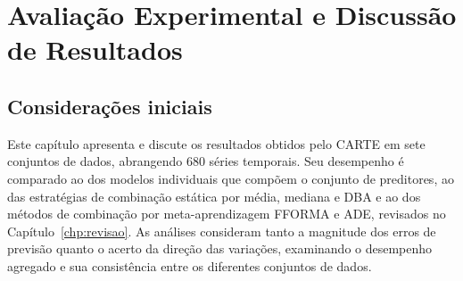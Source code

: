 \chapter{Avaliação Experimental e Discussão de Resultados}\label{chp:resultados}

\section{Considerações iniciais} \label{sec:resultados-iniciais}



Este capítulo apresenta e discute os resultados obtidos pelo CARTE em sete conjuntos de dados, abrangendo 680 séries temporais. Seu desempenho é comparado ao dos modelos individuais que compõem o conjunto de preditores, ao das estratégias de combinação estática por média, mediana e DBA e ao dos métodos de combinação por meta-aprendizagem FFORMA e ADE, revisados no Capítulo~\ref{chp:revisao}. As análises consideram tanto a magnitude dos erros de previsão quanto o acerto da direção das variações, examinando o desempenho agregado e sua consistência entre os diferentes conjuntos de dados.

